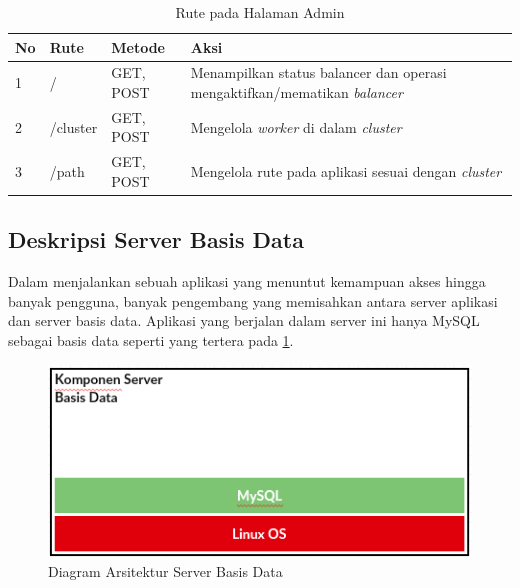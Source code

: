 \documentclass{ta-its}
\begin{document}
				\begin{longtable}{|p{}|p{}|p{}|p{}|} %
					
					\caption{Rute pada Halaman Admin} \label{tabelRuteHalamanAdmin} \\
					\hline
					\textbf{No} & \textbf{Rute} & \textbf{Metode} & \textbf{Aksi} \\ \hline
					
					\endhead
					\endfoot
					\endlastfoot
					
					1 & / & GET, POST & Menampilkan status balancer dan operasi mengaktifkan/mematikan \textit{balancer}\\ \hline
					2 & /cluster & GET, POST & Mengelola \textit{worker} di dalam \textit{cluster} \\ \hline
					3 & /path & GET, POST & Mengelola rute pada aplikasi sesuai dengan \textit{cluster} \\ \hline

				\end{longtable}
				
			\subsection{Deskripsi Server Basis Data}
				Dalam menjalankan sebuah aplikasi yang menuntut kemampuan akses hingga banyak pengguna, banyak pengembang yang memisahkan antara server aplikasi dan server basis data. Aplikasi yang berjalan dalam server ini hanya MySQL sebagai basis data seperti yang tertera pada \ref{gambarArsitekturDB}.
			    
				\begin{figure}[h] %
					\centering
					\includegraphics[width=\linewidth]{contoh_img/kompdb}
					\caption{Diagram Arsitektur Server Basis Data}
					\label{gambarArsitekturDB}
				\end{figure}
\end{document}
